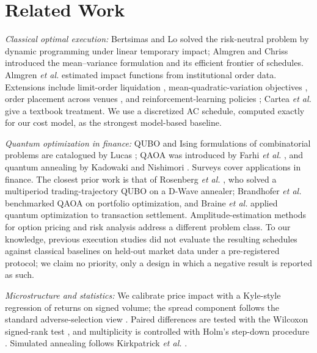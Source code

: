 \documentclass[journal]{IEEEtran}
\begin{document}
\section{Related Work}
\label{sec:related}

\emph{Classical optimal execution:} Bertsimas and Lo \cite{bertsimas1998} solved the
risk-neutral problem by dynamic programming under linear temporary impact; Almgren and
Chriss \cite{almgren2001} introduced the mean--variance formulation and its efficient
frontier of schedules. Almgren \emph{et al.} \cite{almgren2005} estimated impact functions
from institutional order data. Extensions include limit-order liquidation \cite{gueant2012},
mean-quadratic-variation objectives \cite{forsyth2012}, order placement across venues
\cite{cont2017}, and reinforcement-learning policies \cite{ning2021}; Cartea \emph{et al.}
\cite{cartea2015} give a textbook treatment. We use a discretized AC schedule, computed
exactly for our cost model, as the strongest model-based baseline.

\emph{Quantum optimization in finance:} QUBO and Ising formulations of combinatorial problems
are catalogued by Lucas \cite{lucas2014}; QAOA was introduced by Farhi \emph{et al.}
\cite{farhi2014}, and quantum annealing by Kadowaki and Nishimori \cite{kadowaki1998}.
Surveys \cite{orus2019,egger2020} cover applications in finance. The closest prior work is
that of Rosenberg \emph{et al.} \cite{rosenberg2016}, who solved a multiperiod
trading-trajectory QUBO on a D-Wave annealer; Brandhofer \emph{et al.} \cite{brandhofer2023}
benchmarked QAOA on portfolio optimization, and Braine \emph{et al.} \cite{braine2021}
applied quantum optimization to transaction settlement. Amplitude-estimation methods for
option pricing \cite{stamatopoulos2020} and risk analysis \cite{woerner2019,egger2021credit}
address a different problem class. To our knowledge, previous execution studies did not
evaluate the resulting schedules against classical baselines on held-out market data under a
pre-registered protocol; we claim no priority, only a design in which a negative result is
reported as such.

\emph{Microstructure and statistics:} We calibrate price impact with a Kyle-style regression
\cite{kyle1985} of returns on signed volume; the spread component follows the standard
adverse-selection view \cite{glosten1985,ohara1995}. Paired differences are tested with the
Wilcoxon signed-rank test \cite{wilcoxon1945}, and multiplicity is controlled with Holm's
step-down procedure \cite{holm1979}. Simulated annealing follows Kirkpatrick \emph{et al.}
\cite{kirkpatrick1983}.
\end{document}
